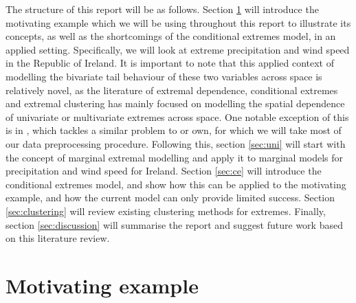 \documentclass{article}
\numberwithin{equation}{section}
\begin{document}
The structure of this report will be as follows.
Section \ref{sec:motivating} will introduce the motivating example which we will be using throughout this report to illustrate its concepts, as well as the shortcomings of the conditional extremes model, in an applied setting.
Specifically, we will look at extreme precipitation and wind speed in the Republic of Ireland. 
It is important to note that this applied context of modelling the bivariate tail behaviour of these two variables across space is relatively novel, as the literature of extremal dependence, conditional extremes and extremal clustering has mainly focused on modelling the spatial dependence of univariate or multivariate extremes across space. 
One notable exception of this is in \citet{Vignotto2021}, which tackles a similar problem to or own, for which we will take most of our data preprocessing procedure. 
Following this, section \ref{sec:uni} will start with the concept of marginal extremal modelling and apply it to marginal models for precipitation and wind speed for Ireland.
Section \ref{sec:ce} will introduce the conditional extremes model, and show how this can be applied to the motivating example, and how the current model can only provide limited success.
Section \ref{sec:clustering} will review existing clustering methods for extremes.
Finally, section \ref{sec:discussion} will summarise the report and suggest future work based on this literature review.

\newpage
\section{Motivating example} \label{sec:motivating}
\end{document}
